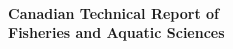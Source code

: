 \thispagestyle{fancyplain}
\DisableFootNotes
\noindent
\begin{flushleft}
\LARGE
\textbf{\titlecap{\trTitle{}}}\\
\vfill
\Large
\trAuthsLong{}
\vfill
\trAddy{}
\vfill
\trYear{}
\vfill
\LARGE
\textbf{Canadian Technical Report of\\
Fisheries and Aquatic Sciences \trReportNum{}}
\cfoot{}
\end{flushleft}
\EnableFootNotes
\clearpage
